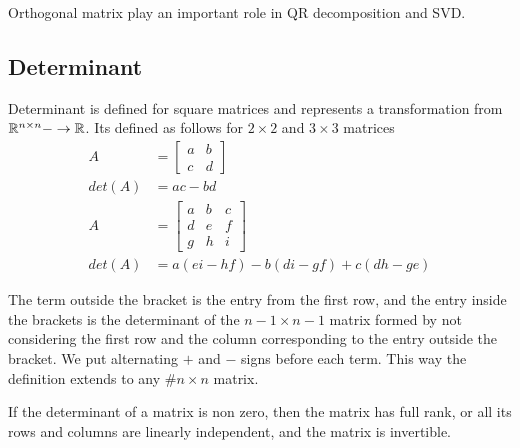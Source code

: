 \documentclass[../../linear_algebra.tex]{subfiles}
\begin{document}
Orthogonal matrix play an important role in QR decomposition and SVD.

\subsection{Determinant}
Determinant is defined for square matrices and represents a transformation from $\mathbb{R}^{n \times n} -\to \mathbb{R}$. Its defined as follows for $2 \times 2$ and $3 \times 3$ matrices
\begin{align*}
    A &= \begin{bmatrix}
        a &b\\ c &d
    \end{bmatrix}\\
    det(A) &= ac - bd\\
    A &= \begin{bmatrix}
        a &b &c\\ d &e &f\\ g &h &i
    \end{bmatrix}\\
    det(A) &= a(ei-hf) - b(di - gf) + c(dh - ge)
\end{align*}

The term outside the bracket is the entry from the first row, and the entry inside the brackets is the determinant of the $n-1 \times n-1$ matrix formed by not considering the first row and the column corresponding to the entry outside the bracket. We put alternating $+$ and $-$ signs before each term. This way the definition extends to any #$n \times n$ matrix.\newline

If the determinant of a matrix is non zero, then the matrix has full rank, or all its rows and columns are linearly independent, and the matrix is invertible.
\end{document}
